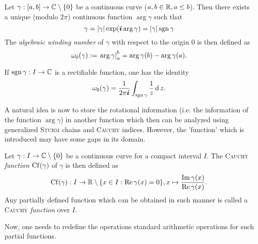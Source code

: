 \message{ !name(On The Routh-Hurwitz Theorem.tex)}\documentclass[10pt,a4paper]{article}
\begin{document}


\begin{definition}
Let $\gamma:[a,b]\rightarrow\mathbb{C}\setminus\{0\}$ be a continuous curve ($a,b\in\mathbb{R},a\leq b$). Then there exists a unique (modulo $2\pi$) continuous function $\arg{\gamma}$ such that 
\begin{equation}
\gamma = \left|\gamma\right|\exp(\boldsymbol{i}\arg{\gamma}) = \left|\gamma\right|\operatorname{sgn}{\gamma}
\end{equation}
The \emph{algebraic winding number} of $\gamma$ with respect to the origin 0 is then defined as
\begin{equation}
\omega_0(\gamma) := \left. \arg{\gamma}\right\vert^b_a = \arg{\gamma(b)}-\arg{\gamma(a)}\text{.}
\end{equation}

\end{definition}

\begin{remark}
If $\operatorname{sgn}{\gamma}:I\rightarrow\mathbb{C}$ is a rectifiable function, one has the identity
\begin{equation}
\omega_0(\gamma)=\frac{1}{2\pi\boldsymbol{i}}\int_{\operatorname{sgn}{\gamma}}{\frac{1}{z}}\operatorname{d}{z}\text{.}
\end{equation}
\end{remark}

A natural idea is now to store the rotational information (i.e. the information of the function $\arg{\gamma}$) in another function which then can be analyzed using generalized \textsc{Sturm} chains and \textsc{Cauchy} indices. However, the 'function' which is introduced may have some gaps in its domain.

\begin{definition} Let $\gamma:I\rightarrow\mathbb{C}\setminus\{0\}$ be a continuous curve for a compact interval $I$. The \textsc{Cauchy} \emph{function} $\operatorname{Cf}(\gamma)$ of $\gamma$ is then defined as
\begin{equation}
\operatorname{Cf}(\gamma):I\rightarrow\mathbb{R}\setminus\{x\in I:\operatorname{Re}{\gamma(x)}=0\},x\mapsto\frac{\operatorname{Im}{\gamma(x)}}{\operatorname{Re}{\gamma(x)}}\text{.}
\end{equation}
Any partially defined function which can be obtained in such manner is called a \textsc{Cauchy} \emph{function} over $I$.
\end{definition}


Now, one needs to redefine the operations standard arithmetic operations for such partial functions.
\end{document}
